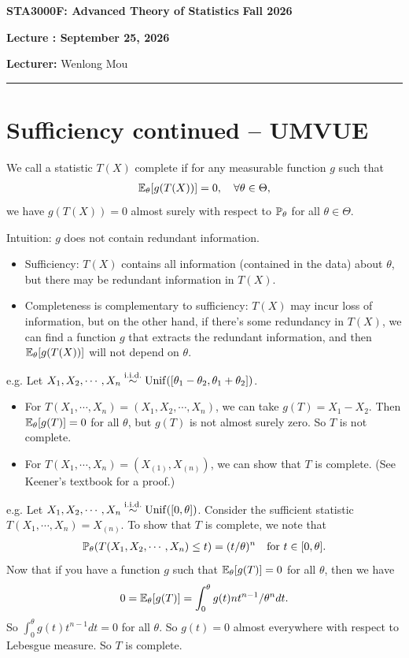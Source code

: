 \documentclass[11pt,letterpaper]{article}
\newcommand{\coursenumber}{STA3000F}
\newcommand{\coursetitle}{Advanced Theory of Statistics}
\newcommand{\courseterm}{Fall 2026}
\newcounter{lecture}
\newcommand{\lecturenumber}{\arabic{lecture}}
\newcommand{\lecturedate}{September 25, 2026}
\newcommand{\lecturer}{Wenlong Mou}
\numberwithin{theorem}{lecture}
\numberwithin{proposition}{lecture}
\numberwithin{lemma}{lecture}
\numberwithin{claim}{lecture}
\numberwithin{corollary}{lecture}
\numberwithin{definition}{lecture}
\numberwithin{conjecture}{lecture}
\numberwithin{remark}{lecture}
\numberwithin{example}{lecture}
\numberwithin{equation}{lecture}
\newcommand{\makelecturenotesheader}{%
  \noindent
  \textbf{\coursenumber: \coursetitle}%
  \hfill
  \textbf{\courseterm}

  \begin{center}
    {\Large\bfseries Lecture \lecturenumber: \lecturedate}
  \end{center}

  \noindent
  \textbf{Lecturer:} \lecturer
  \par\medskip
  \hrule
  \bigskip
}
\begin{document}
\makelecturenotesheader

\section{Sufficiency continued -- UMVUE}
\begin{definition}
  We call a statistic $T(X)$ complete if for any measurable function $g$ such that
  \begin{align*}
    {\mathbb{E}}_\theta [g(T(X))] = 0, \quad \forall \theta \in \Theta,
  \end{align*}
  we have $g(T(X)) = 0$ almost surely with respect to ${\mathbb{P}}_\theta$ for all $\theta \in \Theta$.
\end{definition}
Intuition: $g$ does not contain redundant information.
\begin{itemize}
  \item Sufficiency: $T(X)$ contains all information (contained in the data) about $\theta$, but there may be redundant information in $T(X)$.
  \item Completeness is complementary to sufficiency: $T(X)$ may incur loss of information, but on the other hand, if there's some redundancy in $T(X)$, we can find a function $g$ that extracts the redundant information, and then ${\mathbb{E}}_\theta [g(T(X))]$ will not depend on $\theta$.
\end{itemize}
e.g. Let $X_1, X_2, \cdots, X_n \overset{\mathrm{i.i.d.}}{\sim} \mathrm{Unif} ([\theta_1 - \theta_2, \theta_1 + \theta_2])$.
\begin{itemize}
  \item For $T (X_1, \cdots, X_n) = (X_1, X_2, \cdots, X_n)$, we can take $g(T) = X_1 - X_2$. Then ${\mathbb{E}}_\theta [g(T)] = 0$ for all $\theta$, but $g(T)$ is not almost surely zero. So $T$ is not complete.
  \item For $T (X_1, \cdots, X_n) = (X_{(1)}, X_{(n)})$, we can show that $T$ is complete. (See Keener's textbook for a proof.)
\end{itemize}
e.g. Let $X_1, X_2, \cdots, X_n \overset{\mathrm{i.i.d.}}{\sim} \mathrm{Unif} ([0, \theta])$. Consider the sufficient statistic $T(X_1, \cdots, X_n) = X_{(n)}$. To show that $T$ is complete, we note that
\begin{align*}
  {\mathbb{P}}_\theta (T (X_1, X_2, \cdots, X_n) \leq t) = (t / \theta)^n \quad \text{for } t \in [0, \theta].
\end{align*}
Now that if you have a function $g$ such that ${\mathbb{E}}_\theta [g(T)] = 0$ for all $\theta$, then we have
\begin{align*}
    0 = {\mathbb{E}}_\theta [g(T)] = \int_0^\theta g(t) n t^{n-1} / \theta^n dt.
\end{align*}
So $\int_0^\theta g(t) t^{n-1} dt = 0$ for all $\theta$. So $g (t) = 0$ almost everywhere with respect to Lebesgue measure. So $T$ is complete.
\end{document}
